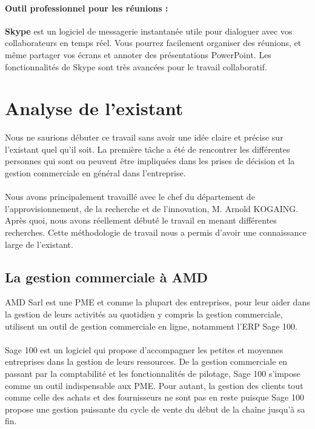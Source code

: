  \paragraph{Outil professionnel pour les réunions : } \textbf{Skype} est un logiciel de messagerie instantanée utile pour dialoguer avec vos collaborateurs en temps réel. Vous pourrez facilement organiser des réunions, et même partager vos écrans et annoter des présentations PowerPoint. Les fonctionnalités de Skype sont très avancées pour le travail collaboratif.
\section{Analyse de l’existant}
 Nous ne saurions débuter ce travail sans avoir une idée claire et précise sur l’existant quel qu’il soit. La première tâche a été de rencontrer les différentes personnes qui sont ou peuvent être impliquées dans les prises de décision et la gestion commerciale en général dans l’entreprise. 
 \paragraph{}
 Nous avons principalement travaillé avec le chef du département de l’approvisionnement, de la recherche et de l’innovation, M. Arnold KOGAING. Après quoi, nous avons réellement débuté le travail en menant différentes recherches. Cette méthodologie de travail nous a permis d’avoir une connaissance large de l’existant.
 
 \subsection{La gestion commerciale à AMD}
 AMD Sarl est une PME et comme la plupart des entreprises, pour leur aider dans la gestion de leurs activités au quotidien y compris la gestion commerciale, utilisent un outil de gestion commerciale en ligne, notamment l’ERP Sage 100.
 \paragraph{}
 Sage 100 est un logiciel qui propose d’accompagner les petites et moyennes entreprises dans la gestion de leurs ressources. De la gestion commerciale en passant par la comptabilité et les fonctionnalités de pilotage, Sage 100 s’impose comme un outil indispensable aux PME. Pour autant, la gestion des clients tout comme celle des achats et des fournisseurs ne sont pas en reste puisque Sage 100 propose une gestion puissante du cycle de vente du début de la chaîne jusqu’à sa fin.
